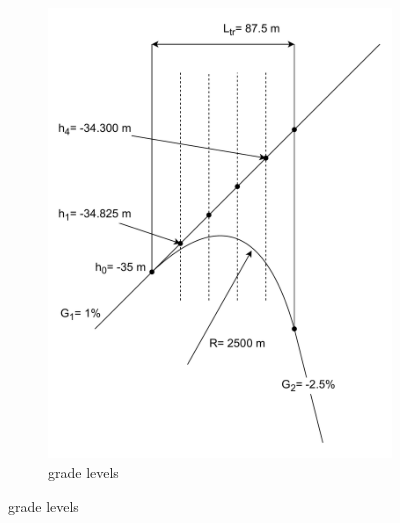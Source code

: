 \documentclass{bcrre_exam}
\begin{document}
\begin{figure}[p]
\begin{subfigure}[b]{0.48\textwidth}
        \includegraphics[width=\textwidth]{images/track-alignment-worksheet-vertical-curve-heights.drawio.pdf}
        \caption{grade levels}
        \label{fig:vertical-curve-height}
    \end{subfigure}
    

\end{figure}
\end{document}
